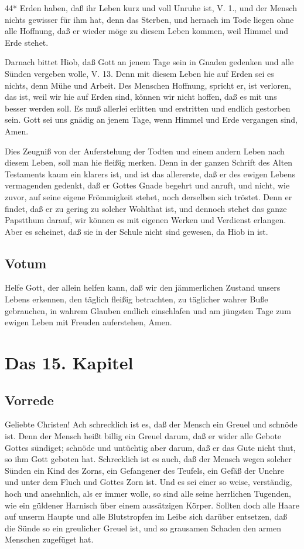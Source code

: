 44*
Erden haben, daß ihr Leben kurz und voll Unruhe ist, V. 1., und der Mensch nichts gewisser für ihm hat, denn das Sterben, und hernach im Tode liegen ohne alle Hoffnung, daß er wieder möge zu diesem Leben kommen, weil Himmel und Erde stehet.

Darnach bittet Hiob, daß Gott an jenem Tage sein in Gnaden gedenken und alle Sünden vergeben wolle, V. 13. Denn mit diesem Leben hie auf Erden sei es nichts, denn Mühe und Arbeit. Des Menschen Hoffnung, spricht er, ist verloren, das ist, weil wir hie auf Erden sind, können wir nicht hoffen, daß es mit uns besser werden soll. Es muß allerlei erlitten und erstritten und endlich gestorben sein. Gott sei uns gnädig an jenem Tage, wenn Himmel und Erde vergangen sind, Amen.

Dies Zeugniß von der Auferstehung der Todten und einem andern Leben nach diesem Leben, soll man hie fleißig merken. Denn in der ganzen Schrift des Alten Testaments kaum ein klarers ist, und ist das allererste, daß er des ewigen Lebens vermagenden gedenkt, daß er Gottes Gnade begehrt und anruft, und nicht, wie zuvor, auf seine eigene Frömmigkeit stehet, noch derselben sich tröstet. Denn er findet, daß er zu gering zu solcher Wohlthat ist, und dennoch stehet das ganze Papstthum darauf, wir können es mit eigenen Werken und Verdienst erlangen. Aber es scheinet, daß sie in der Schule nicht sind gewesen, da Hiob in ist.

\section{Votum}

Helfe Gott, der allein helfen kann, daß wir den jämmerlichen Zustand unsers Lebens erkennen, den täglich fleißig betrachten, zu täglicher wahrer Buße gebrauchen, in wahrem Glauben endlich einschlafen und am jüngsten Tage zum ewigen Leben mit Freuden auferstehen, Amen.

\chapter{Das 15. Kapitel}

\section{Vorrede}

Geliebte Christen! Ach schrecklich ist es, daß der Mensch ein Greuel und schnöde ist. Denn der Mensch heißt billig ein Greuel darum, daß er wider alle Gebote Gottes sündiget; schnöde und untüchtig aber darum, daß er das Gute nicht thut, so ihm Gott geboten hat. Schrecklich ist es auch, daß der Mensch wegen solcher Sünden ein Kind des Zorns, ein Gefangener des Teufels, ein Gefäß der Unehre und unter dem Fluch und Gottes Zorn ist. Und es sei einer so weise, verständig, hoch und ansehnlich, als er immer wolle, so sind alle seine herrlichen Tugenden, wie ein güldener Harnisch über einem aussätzigen Körper. Sollten doch alle Haare auf unserm Haupte und alle Blutstropfen im Leibe sich darüber entsetzen, daß die Sünde so ein greulicher Greuel ist, und so grausamen Schaden den armen Menschen zugefüget hat.

